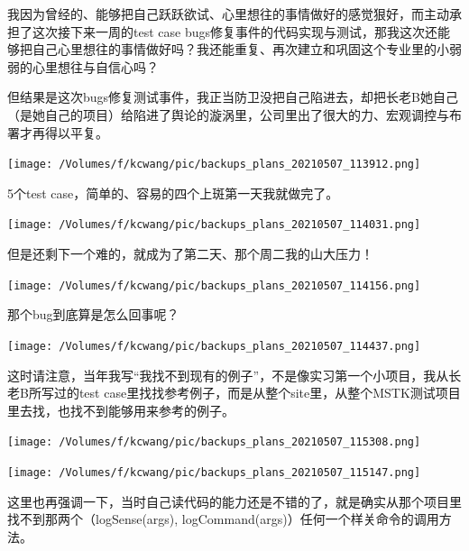 \documentclass[9pt, b5paper]{article}
\begin{document}
我因为曾经的、能够把自己跃跃欲试、心里想往的事情做好的感觉狠好，而主动承担了这次接下来一周的test case bugs修复事件的代码实现与测试，那我这次还能够把自己心里想往的事情做好吗？我还能重复、再次建立和巩固这个专业里的小弱弱的心里想往与自信心吗？

但结果是这次bugs修复测试事件，我正当防卫没把自己陷进去，却把长老B她自己（是她自己的项目）给陷进了舆论的漩涡里，公司里出了很大的力、宏观调控与布署才再得以平复。

\begin{center}
\texttt{[image: /Volumes/f/kcwang/pic/backups\_plans\_20210507\_113912.png]}
\end{center}

5个test case，简单的、容易的四个上斑第一天我就做完了。 

\begin{center}
\texttt{[image: /Volumes/f/kcwang/pic/backups\_plans\_20210507\_114031.png]}
\end{center}

但是还剩下一个难的，就成为了第二天、那个周二我的山大压力！

\begin{center}
\texttt{[image: /Volumes/f/kcwang/pic/backups\_plans\_20210507\_114156.png]}
\end{center}

那个bug到底算是怎么回事呢？

\begin{center}
\texttt{[image: /Volumes/f/kcwang/pic/backups\_plans\_20210507\_114437.png]}
\end{center}

这时请注意，当年我写“我找不到现有的例子”，不是像实习第一个小项目，我从长老B所写过的test case里找找参考例子，而是从整个site里，从整个MSTK测试项目里去找，也找不到能够用来参考的例子。 

\begin{center}
\texttt{[image: /Volumes/f/kcwang/pic/backups\_plans\_20210507\_115308.png]}
\end{center}

\begin{center}
\texttt{[image: /Volumes/f/kcwang/pic/backups\_plans\_20210507\_115147.png]}
\end{center}

这里也再强调一下，当时自己读代码的能力还是不错的了，就是确实从那个项目里找不到那两个（logSense(args), logCommand(args)）任何一个样关命令的调用方法。
\end{document}
